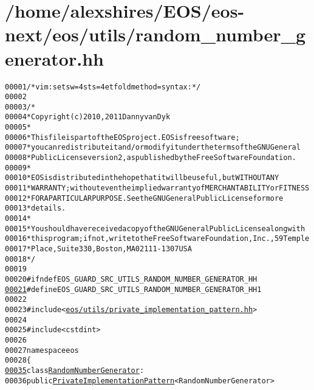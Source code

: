 \hypertarget{random__number__generator_8hh_source}{
\section{/home/alexshires/EOS/eos-\/next/eos/utils/random\_\-number\_\-generator.hh}
}


\begin{footnotesize}\begin{alltt}
00001 \textcolor{comment}{/* vim: set sw=4 sts=4 et foldmethod=syntax : */}
00002 
00003 \textcolor{comment}{/*}
00004 \textcolor{comment}{ * Copyright (c) 2010, 2011 Danny van Dyk}
00005 \textcolor{comment}{ *}
00006 \textcolor{comment}{ * This file is part of the EOS project. EOS is free software;}
00007 \textcolor{comment}{ * you can redistribute it and/or modify it under the terms of the GNU General}
00008 \textcolor{comment}{ * Public License version 2, as published by the Free Software Foundation.}
00009 \textcolor{comment}{ *}
00010 \textcolor{comment}{ * EOS is distributed in the hope that it will be useful, but WITHOUT ANY}
00011 \textcolor{comment}{ * WARRANTY; without even the implied warranty of MERCHANTABILITY or FITNESS}
00012 \textcolor{comment}{ * FOR A PARTICULAR PURPOSE.  See the GNU General Public License for more}
00013 \textcolor{comment}{ * details.}
00014 \textcolor{comment}{ *}
00015 \textcolor{comment}{ * You should have received a copy of the GNU General Public License along with}
00016 \textcolor{comment}{ * this program; if not, write to the Free Software Foundation, Inc., 59 Temple}
00017 \textcolor{comment}{ * Place, Suite 330, Boston, MA  02111-1307  USA}
00018 \textcolor{comment}{ */}
00019 
00020 \textcolor{preprocessor}{#ifndef EOS\_GUARD\_SRC\_UTILS\_RANDOM\_NUMBER\_GENERATOR\_HH}
\hypertarget{random__number__generator_8hh_source_l00021}{}\hyperlink{random__number__generator_8hh_a191c5ad3acb1207ac8224f9d80ca1868}{00021} \textcolor{preprocessor}{}\textcolor{preprocessor}{#define EOS\_GUARD\_SRC\_UTILS\_RANDOM\_NUMBER\_GENERATOR\_HH 1}
00022 \textcolor{preprocessor}{}
00023 \textcolor{preprocessor}{#include <\hyperlink{private__implementation__pattern_8hh}{eos/utils/private_implementation_pattern.hh}>}
00024 
00025 \textcolor{preprocessor}{#include <cstdint>}
00026 
00027 \textcolor{keyword}{namespace }eos
00028 \{
\hypertarget{random__number__generator_8hh_source_l00035}{}\hyperlink{classeos_1_1RandomNumberGenerator}{00035}     \textcolor{keyword}{class }\hyperlink{classeos_1_1RandomNumberGenerator}{RandomNumberGenerator} :
00036         \textcolor{keyword}{public} \hyperlink{classeos_1_1PrivateImplementationPattern}{PrivateImplementationPattern}<RandomNumberGenerator>

\end{alltt}
\end{footnotesize}
